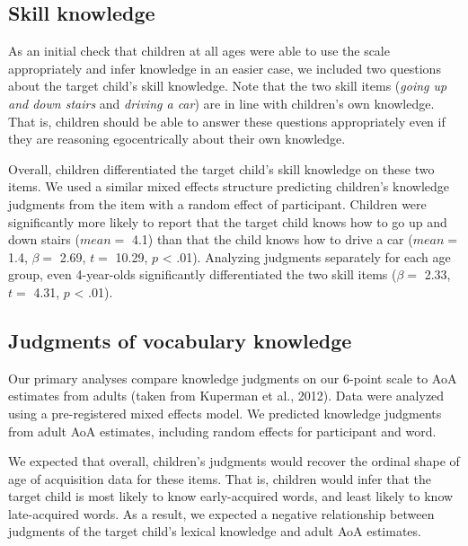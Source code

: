 \documentclass[10pt, letterpaper]{article}
\begin{document}
\hypertarget{skill-knowledge}{%
\subsection{Skill knowledge}\label{skill-knowledge}}

As an initial check that children at all ages were able to use the scale
appropriately and infer knowledge in an easier case, we included two
questions about the target child's skill knowledge. Note that the two
skill items (\emph{going up and down stairs} and \emph{driving a car})
are in line with children's own knowledge. That is, children should be
able to answer these questions appropriately even if they are reasoning
egocentrically about their own knowledge.

Overall, children differentiated the target child's skill knowledge on
these two items. We used a similar mixed effects structure predicting
children's knowledge judgments from the item with a random effect of
participant. Children were significantly more likely to report that the
target child knows how to go up and down stairs (\(mean =\) 4.1) than
that the child knows how to drive a car (\(mean =\) 1.4, \(\beta =\)
2.69, \(t =\) 10.29, \(p\) \textless{} .01). Analyzing judgments
separately for each age group, even 4-year-olds significantly
differentiated the two skill items (\(\beta =\) 2.33, \(t =\) 4.31,
\(p\) \textless{} .01).

\hypertarget{judgments-of-vocabulary-knowledge}{%
\subsection{Judgments of vocabulary
knowledge}\label{judgments-of-vocabulary-knowledge}}

Our primary analyses compare knowledge judgments on our 6-point scale to
AoA estimates from adults (taken from Kuperman et al., 2012). Data were
analyzed using a pre-registered mixed effects model. We predicted
knowledge judgments from adult AoA estimates, including random effects
for participant and word.

We expected that overall, children's judgments would recover the ordinal
shape of age of acquisition data for these items. That is, children
would infer that the target child is most likely to know early-acquired
words, and least likely to know late-acquired words. As a result, we
expected a negative relationship between judgments of the target child's
lexical knowledge and adult AoA estimates.
\end{document}
